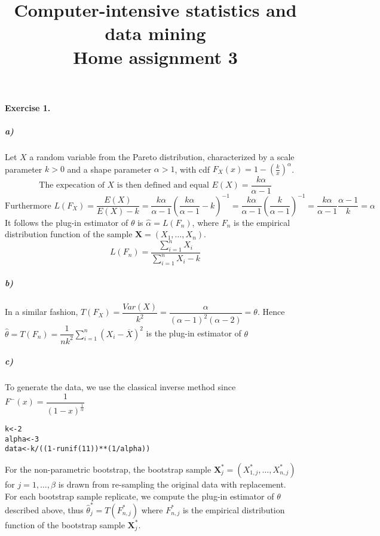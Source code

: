 \documentclass{article}
\author{\and Susanne Bornelöv \and Thibault Latrille \and Yiming Zhang}
\title{Computer-intensive statistics and data mining
 \\ Home assignment 3}
\begin{document}
\maketitle
\paragraph{Exercise 1.}
\subparagraph{a)}
Let $X$ a random variable from the Pareto distribution, characterized by a scale parameter $k>0$ and a shape parameter $\alpha>1$, with cdf $F_X(x)=1-(\frac{k}{x})^{\alpha}$. 
$$\text{The expecation of $X$ is then defined and equal  }E(X)=\dfrac{k\alpha}{\alpha-1}$$ $$\text{Furthermore } L(F_X)=\dfrac{E(X)}{E(X)-k}=\dfrac{k\alpha}{\alpha-1} \left( \dfrac{k\alpha}{\alpha-1}-k \right)^{-1}=\dfrac{k\alpha}{\alpha-1} \left( \dfrac{k}{\alpha-1} \right)^{-1}=\dfrac{k\alpha}{\alpha-1}  \dfrac{\alpha-1}{k}=\alpha$$ It follows the plug-in estimator of $\theta$ is $\widehat{\alpha}=L(F_n)$, where $F_n$ is the empirical distribution
function of the sample $\pmb{X}=(X_1,\ldots,X_n)$.
$$L(F_n)=\dfrac{\sum_{i=1}^n X_i}{\sum_{i=1}^n X_i-k}$$
\subparagraph{b)}
In a similar fashion,  $T(F_X)=\dfrac{Var(X)}{k^2}=\dfrac{\alpha}{(\alpha-1)^2(\alpha-2)}=\theta$. Hence $\widehat{\theta}=T(F_n)=\dfrac{1}{nk^2}\sum_{i=1}^n(X_i-\overline{X})^2$ is the plug-in estimator of $\theta$
\subparagraph{c)}
To generate the data, we use the classical inverse method since $F^-(x)=\dfrac{1}{(1-x)^{\frac{1}{\alpha}}}$

\begin{footnotesize}
\begin{verbatim}
k<-2
alpha<-3
data<-k/((1-runif(11))**(1/alpha))
\end{verbatim} 
\end{footnotesize}

For the non-parametric bootstrap, the bootstrap sample $\pmb{X}_j^*=(X_{1,j}^*,\ldots,X_{n,j}^*)$ for $j=1,\ldots,\beta$ is drawn from re-sampling the original data with replacement.\\


For each bootstrap sample replicate, we compute the plug-in estimator of $\theta$ described above, thus $\widehat{\theta}_j^*=T(F_{n,j}^*)$ where $F_{n,j}^*$ is the empirical distribution function of the bootstrap sample $\pmb{X}_j^*$. 
\\
\end{document}
